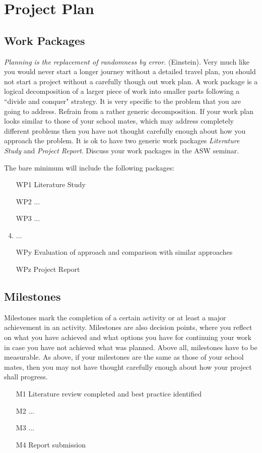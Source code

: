 \documentclass[rnd]{mas_proposal}
\begin{document}
\section{Project Plan}

\subsection{Work Packages}
\emph{Planning is the replacement of randomness by error.} (Einstein). Very much like you would never start a longer journey without a detailed travel plan, you should not start a project without a carefully though out work plan. A work package is a logical decomposition of a larger piece of work into smaller parts following a ``divide and conquer" strategy. It is very specific to the problem that you are going to address. Refrain from a rather generic decomposition. If your work plan looks similar to those of your school mates, which may address completely different problems then you have not thought carefully enough about how you approach the problem. It is ok to have two generic work packages \emph{Literature Study} and \emph{Project Report}. Discuss your work packages in the ASW seminar.

The bare minimum will include the following packages:
\begin{enumerate}
    \item[WP1] Literature Study
    \item[WP2] ...
    \item[WP3] ...
    \item  ...
    \item[WPy] Evaluation of approach and comparison with similar approaches
    \item[WPz] Project Report
\end{enumerate}

\subsection{Milestones}
Milestones mark the completion of a certain activity or at least a major achievement in an activity. Milestones are also decision points, where you reflect on what you have achieved and what options you have for continuing your work in case you have not achieved what was planned. Above all, milestones have to be measurable. As above, if your milestones are the same as those of your school mates, then you may not have thought carefully enough about how your project shall progress.
\begin{enumerate}
    \item[M1] Literature review completed and best practice identified
    \item[M2] ...
    \item[M3] ...
    \item[M4] Report submission
\end{enumerate}
\end{document}

